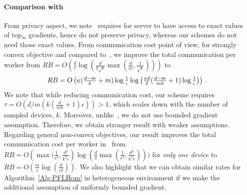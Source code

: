 \documentclass{article}
\newcommand*{\Resize}[2]{\resizebox{#1}{!}{$#2$}}%
\begin{document}
\paragraph{Comparison with~\citet{ivkin2019communication}}
From privacy aspect, we note~\citet{ivkin2019communication} requires for server to have access to exact values of top$_m$ gradients, hence do not preserve privacy, whereas our schemes do not need those exact values. From communication cost point of view, for strongly convex objective and compared to~\citet{ivkin2019communication}, we improve the total communication per worker from 
$RB=O\left(\frac{ d}{\epsilon}\log\left(\frac{d}{\delta\sqrt{\epsilon}}\max\left(\frac{ d}{m},\frac{1}{\sqrt{\epsilon}}\right)\right)\right)$ to 
\[ \Resize{8cm}{RB=O\left(\kappa(\frac{d-m}{k}+m)\log\frac{1}{\epsilon}\log\left(\frac{\kappa d}{\delta}(\frac{d-m}{mk}+1)\log\frac{1}{\epsilon}\right)\right)}\ .\]
We note that while reducing communication cost, our scheme requires $\tau=O(d/m(k(\frac{ d}{mk}+1)\epsilon))>1$, which scales down with the number of sampled devices, $k$. 
Moreover, unlike~\citet{ivkin2019communication}, we do not use bounded gradient assumption. 
Therefore, we obtain stronger result with weaker assumptions. 
Regarding general non-convex objectives, our result improves the total communication cost per worker in~\citet{ivkin2019communication} from $RB=O\left(\max(\frac{1}{\epsilon^2},\frac{d^2}{k^2\epsilon}\right)\log(\frac{d}{\delta}\max(\frac{1}{\epsilon^2},\frac{d^2}{k^2\epsilon})))$ for \emph{only one device} to $RB=O(\frac{m}{\epsilon}\log(\frac{d}{\epsilon\delta}))$. 
We also highlight that we can obtain similar rates for Algorithm~\ref{Alg:PFLHom} in heterogeneous environment if we make the additional assumption of uniformly bounded gradient.
\end{document}
